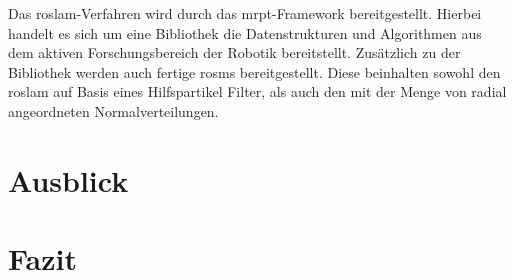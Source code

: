 Das \gls{roslam}-Verfahren wird durch das \gls{mrpt}-Framework bereitgestellt. Hierbei handelt es sich um eine Bibliothek die Datenstrukturen und Algorithmen aus dem aktiven Forschungsbereich der Robotik bereitstellt. Zusätzlich zu der Bibliothek werden auch fertige \glspl{rosm} bereitgestellt. Diese beinhalten sowohl den  \gls{roslam} auf Basis eines Hilfspartikel Filter, als auch den mit der Menge von radial angeordneten Normalverteilungen.







%
%
\section{Ausblick}


%
%
\section{Fazit}


